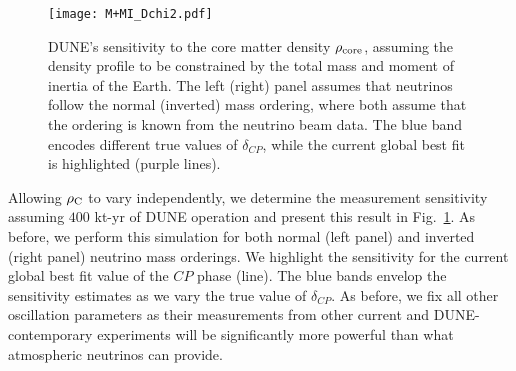\begin{figure}
\begin{center}
\texttt{[image: M+MI\_Dchi2.pdf]}
\caption{DUNE's sensitivity to the core matter density $\rho_{\rm core}$, assuming the density profile to be constrained by the total mass and moment of inertia of the Earth. 
The left (right) panel assumes that neutrinos follow the normal (inverted) mass ordering, where both assume that the ordering is known from the neutrino beam data. 
The blue band encodes different true values of $\delta_{CP}$, while the current global best fit is highlighted (purple lines).\label{fig:MeasRho_MEIE}}
\end{center}
\end{figure}
%
Allowing $\rho_{\rm C}$ to vary independently, we determine the measurement sensitivity assuming $400$ kt-yr of DUNE operation and present this result in Fig.~\ref{fig:MeasRho_MEIE}.
As before, we perform this simulation for both normal (left panel) and inverted (right panel) neutrino mass orderings. 
We highlight the sensitivity for the current global best fit value of the $CP$ phase (line).
The blue bands envelop the sensitivity estimates as we vary the true value of $\delta_{CP}$.
As before, we fix all other oscillation parameters as their measurements from other current and DUNE-contemporary experiments will be significantly more powerful than what atmospheric neutrinos can provide.

